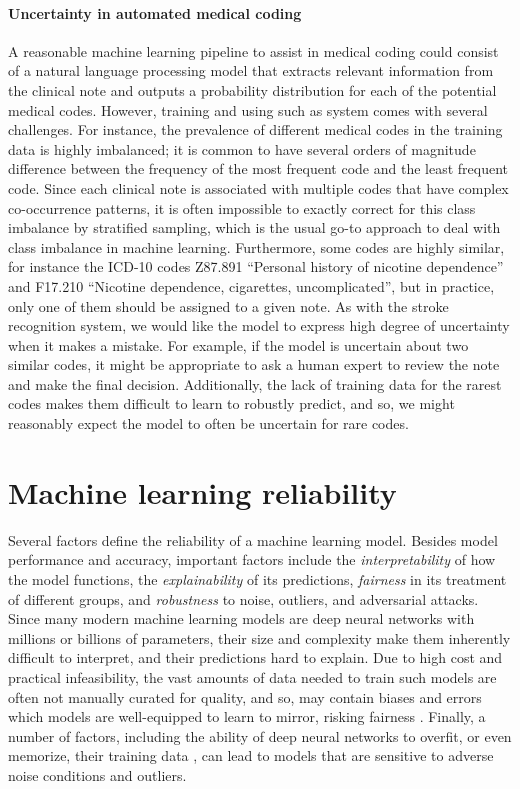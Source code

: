 \paragraph{Uncertainty in automated medical coding} A reasonable machine learning pipeline to assist in medical coding could consist of a natural language processing model that extracts relevant information from the clinical note and outputs a probability distribution for each of the potential medical codes. 
However, training and using such as system comes with several challenges. 
For instance, the prevalence of different medical codes in the training data is highly imbalanced; it is common to have several orders of magnitude difference between the frequency of the most frequent code and the least frequent code. Since each clinical note is associated with multiple codes that have complex co-occurrence patterns, it is often impossible to exactly correct for this class imbalance by stratified sampling, which is the usual go-to approach to deal with class imbalance in machine learning. 
Furthermore, some codes are highly similar, for instance the ICD-10 codes Z87.891 ``Personal history of nicotine dependence'' and F17.210 ``Nicotine dependence, cigarettes, uncomplicated'', but in practice, only one of them should be assigned to a given note. 
As with the stroke recognition system, we would like the model to express high degree of uncertainty when it makes a mistake. For example, if the model is uncertain about two similar codes, it might be appropriate to ask a human expert to review the note and make the final decision. Additionally, the lack of training data for the rarest codes makes them difficult to learn to robustly predict, and so, we might reasonably expect the model to often be uncertain for rare codes. 


\section{Machine learning reliability} \label{sec:machine-learning-reliability}
%
Several factors define the reliability of a machine learning model. 
Besides model performance and accuracy, important factors include the \emph{interpretability} of how the model functions, the \emph{explainability} of its predictions, \emph{fairness} in its treatment of different groups, and \emph{robustness} to noise, outliers, and adversarial attacks. 
Since many modern machine learning models are deep neural networks with millions or billions of parameters, their size and complexity make them inherently difficult to interpret, and their predictions hard to explain. 
Due to high cost and practical infeasibility, the vast amounts of data needed to train such models are often not manually curated for quality, and so, may contain biases and errors which models are well-equipped to learn to mirror, risking fairness \parencite{burkart_survey_2021}. 
Finally, a number of factors, including the ability of deep neural networks to overfit, or even memorize, their training data \parencite{arpit_closer_2017, burg_memorization_2021}, can lead to models that are sensitive to adverse noise conditions and outliers. 

